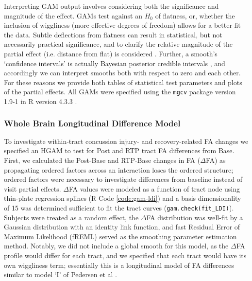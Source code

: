 \documentclass[12pt]{article}
\begin{document}
Interpreting GAM output involves considering both the significance and magnitude of the effect. GAMs test against an $H_0$ of flatness, or, whether the inclusion of wiggliness (more effective degrees of freedom) allows for a better fit the data. Subtle deflections from flatness can result in statistical, but not necessarily practical significance, and to clarify the relative magnitude of the partial effect (i.e. distance from flat) is considered \autocite{baayen2020IntroductionGeneralizedAdditive}. Further, a smooth's `confidence intervals' is actually Bayesian posterior credible intervals \autocite{pedersen2019HierarchicalGeneralizedAdditive}, and accordingly we can interpret smooths both with respect to zero and each other. For these reasons we provide both tables of statistical test parameters and plots of the partial effects. All GAMs were specified using the \lstinline{mgcv} package version 1.9-1 \autocite{wood2017GeneralizedAdditiveModels} in R version 4.3.3 \autocite{rcoreteam2023LanguageEnvironmentStatistical}.


\subsubsection{Whole Brain Longitudinal Difference Model}
\label{sssec:meth-gam-ldi}
To investigate within-tract concussion injury- and recovery-related FA changes we specified an HGAM to test for Post and RTP tract FA differences from Base. First, we calculated the Post-Base and RTP-Base changes in FA ($\Delta$FA) as propagating ordered factors across an interaction loses the ordered structure; ordered factors were necessary to investigate differences from baseline instead of visit partial effects. $\Delta$FA values were modeled as a function of tract node using thin-plate regression splines (R Code \ref{code:gam-ldi}) and a basis dimensionality of 15 was determined sufficient to fit the tract curves (\lstinline{gam.check(fit_LDI)}). Subjects were treated as a random effect, the $\Delta$FA distribution was well-fit by a Gaussian distribution with an identity link function, and fast Residual Error of Maximum Likelihood (fREML) served as the smoothing parameter estimation method. Notably, we did not include a global smooth for this model, as the $\Delta$FA profile would differ for each tract, and we specified that each tract would have its own wiggliness term; essentially this is a longitudinal model of FA differences similar to model `I' of Pedersen et al \autocite{pedersen2019HierarchicalGeneralizedAdditive}.
\end{document}
